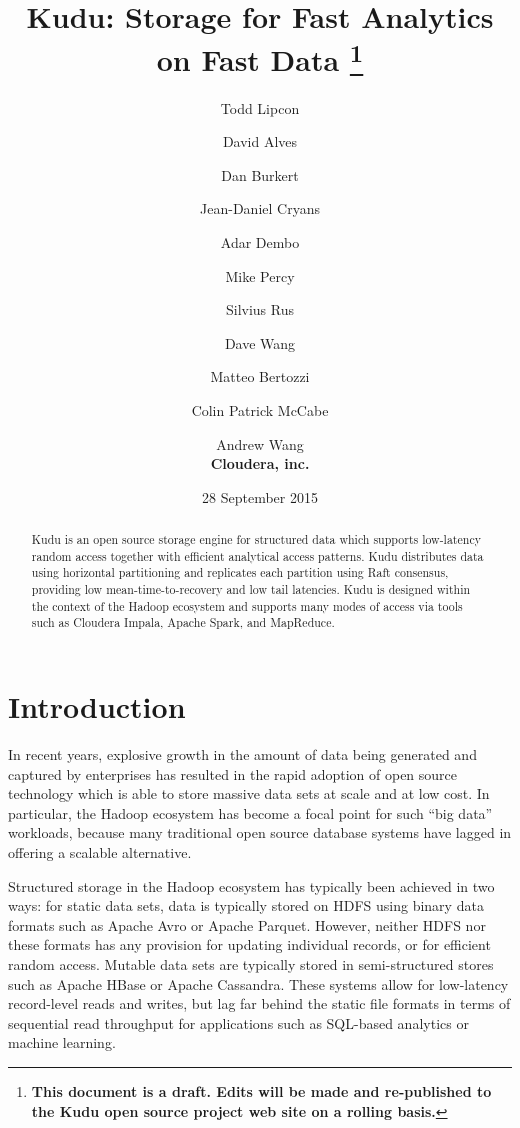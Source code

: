\documentclass{vldb}
\begin{document}
\title{Kudu: Storage for Fast Analytics on Fast Data
\footnote{\bf
This document is a draft. Edits will be made and re-published to the Kudu
open source project web site on a rolling basis.}
}
\author{
  Todd Lipcon \and David Alves \and Dan Burkert \and Jean-Daniel Cryans \and Adar Dembo \and
  Mike Percy \and Silvius Rus \and Dave Wang \and Matteo Bertozzi \and Colin Patrick McCabe \and
  Andrew Wang\\
  {\small \bf Cloudera, inc.}
}

\date{28 September 2015}

\maketitle

\begin{abstract}
Kudu is an open source storage engine for structured data which supports low-latency random access
together with efficient analytical access patterns. Kudu distributes data using
horizontal partitioning and replicates each partition using Raft consensus, providing low
mean-time-to-recovery and low tail latencies. Kudu is designed within the context of the Hadoop
ecosystem and supports many modes of access via tools such as Cloudera Impala\cite{impala},
Apache Spark\cite{spark}, and MapReduce\cite{mapreduce}.
\end{abstract}

\section{Introduction}
\label{sec:introduction}
In recent years, explosive growth in the amount of data being generated and captured by
enterprises has resulted in the rapid adoption of open source technology which is able to
store massive data sets at scale and at low cost. In particular, the Hadoop ecosystem has become a focal
point for such ``big data'' workloads, because many traditional open source database systems have
lagged in offering a scalable alternative.

Structured storage in the Hadoop ecosystem has typically been achieved in two ways: for static data sets,
data is typically stored on HDFS using binary data formats such as Apache Avro\cite{avro} or
Apache Parquet\cite{parquet}. However, neither HDFS nor these formats has any provision for updating
individual records, or for efficient random access. Mutable data sets are typically stored in
semi-structured stores such as Apache HBase\cite{hbase} or Apache Cassandra\cite{cassandra}. These systems allow for low-latency
record-level reads and writes, but lag far behind the static file formats in terms of sequential
read throughput for applications such as SQL-based analytics or machine learning.
\end{document}
